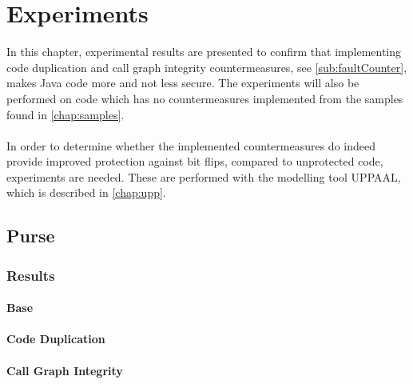 \chapter{Experiments}
In this chapter, experimental results are presented to confirm that implementing code duplication and call graph integrity countermeasures, see \cref{sub:faultCounter}, makes Java code more and not less secure. The experiments will also be performed on code which has no countermeasures implemented from the \jc samples found in \cref{chap:samples}.\\\\
In order to determine whether the implemented countermeasures do indeed provide improved protection against bit flips, compared to unprotected code, experiments are needed. These are performed with the modelling tool UPPAAL, which is described in \cref{chap:upp}.
%
\section{\jc Purse}

\subsection*{Results}

\subsubsection{Base}

\subsubsection{Code Duplication}

\subsubsection{Call Graph Integrity}

